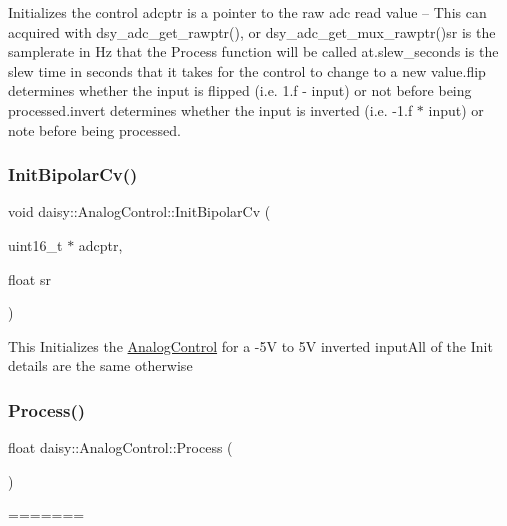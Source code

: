 Initializes the control adcptr is a pointer to the raw adc read value -- This can acquired with dsy\+\_\+adc\+\_\+get\+\_\+rawptr(), or dsy\+\_\+adc\+\_\+get\+\_\+mux\+\_\+rawptr()sr is the samplerate in Hz that the Process function will be called at.\+slew\+\_\+seconds is the slew time in seconds that it takes for the control to change to a new value.\+flip determines whether the input is flipped (i.\+e. 1.\+f -\/ input) or not before being processed.\+invert determines whether the input is inverted (i.\+e. -\/1.\+f $\ast$ input) or note before being processed. \mbox{\label{classdaisy_1_1_analog_control_aec736f5848fc9badbec878a48a7cd7c5}} 
\subsubsection{\texorpdfstring{Init\+Bipolar\+Cv()}{InitBipolarCv()}}
{\footnotesize\ttfamily void daisy\+::\+Analog\+Control\+::\+Init\+Bipolar\+Cv (\begin{DoxyParamCaption}\item[{uint16\+\_\+t $\ast$}]{adcptr,  }\item[{float}]{sr }\end{DoxyParamCaption})}

This Initializes the \hyperlink{classdaisy_1_1_analog_control}{Analog\+Control} for a -\/5V to 5V inverted input\+All of the Init details are the same otherwise \mbox{\label{classdaisy_1_1_analog_control_a7109593bfc106dd8ef35aba4434b8321}} 
\subsubsection{\texorpdfstring{Process()}{Process()}}
{\footnotesize\ttfamily float daisy\+::\+Analog\+Control\+::\+Process (\begin{DoxyParamCaption}{ }\end{DoxyParamCaption})}
=======
\mbox{\label{classdaisy_1_1_analog_control_abaf976aa9d20be0ed179cd89040ab689}} 
